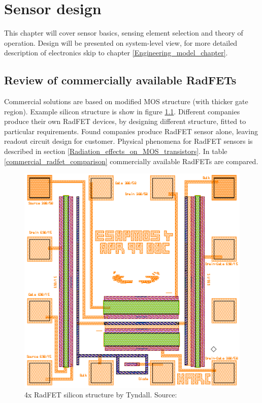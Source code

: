 \chapter{Sensor design}
This chapter will cover sensor basics, sensing element selection and theory of operation. Design will be presented on system-level view, for more detailed description of electronics skip to chapter \ref{Engineering_model_chapter}.

\section{Review of commercially available RadFETs}
    Commercial solutions are based on modified MOS structure (with thicker gate region). Example silicon structure is show in figure \ref{Tyndall_radfet_silicon}. Different companies produce their own RadFET devices, by designing different structure, fitted to particular requirements. Found companies produce RadFET sensor alone, leaving readout circuit design for customer. Physical phenomena for RadFET sensors is described in section \ref{Radiation_effects_on_MOS_transistors}. In table \ref{commercial_radfet_comparison} commercially available RadFETs are compared.

    \begin{figure}[H]
        \centering
        \includegraphics[width=0.3\paperwidth]{img/radfet-silicon.eps}
        \caption{4x RadFET silicon structure by Tyndall. Source: \cite{Tyndall_Radfet}}
        \label{Tyndall_radfet_silicon}
    \end{figure}

